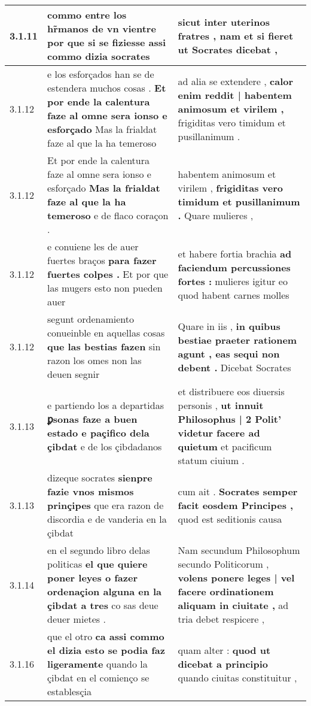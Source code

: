 \begin{tabular}{|p{1cm}|p{6.5cm}|p{6.5cm}|}
3.1.11 & commo entre los hr̃manos de vn vientre \textbf{ por que si se fiziesse } assi commo dizia socrates & sicut inter uterinos fratres , \textbf{ nam et si fieret } ut Socrates dicebat , \\\hline
3.1.12 & e los esforçados han se de estendera muchos cosas . \textbf{ Et por ende la calentura faze al omne sera ionso e esforçado } Mas la frialdat faze al que la ha temeroso & ad alia se extendere , \textbf{ calor enim reddit | habentem animosum et virilem , } frigiditas vero timidum et pusillanimum . \\\hline
3.1.12 & Et por ende la calentura faze al omne sera ionso e esforçado \textbf{ Mas la frialdat faze al que la ha temeroso } e de flaco coraçon . & habentem animosum et virilem , \textbf{ frigiditas vero timidum et pusillanimum . } Quare mulieres , \\\hline
3.1.12 & e conuiene les de auer fuertes braços \textbf{ para fazer fuertes colpes . } Et por que las mugers esto non pueden auer & et habere fortia brachia \textbf{ ad faciendum percussiones fortes : } mulieres igitur eo quod habent carnes molles \\\hline
3.1.12 & segunt ordenamiento conueinble en aquellas cosas \textbf{ que las bestias fazen } sin razon los omes non las deuen segnir & Quare in iis , \textbf{ in quibus bestiae praeter rationem agunt , eas sequi non debent . } Dicebat Socrates \\\hline
3.1.13 & e partiendo los a departidas \textbf{ ꝑsonas faze a buen estado e paçifico dela çibdat } e de los çibdadanos & et distribuere eos diuersis personis , \textbf{ ut innuit Philosophus | 2 Polit’ videtur facere ad quietum } et pacificum statum ciuium . \\\hline
3.1.13 & dizeque socrates \textbf{ sienpre fazie vnos mismos prinçipes } que era razon de discordia e de vanderia en la çibdat & cum ait . \textbf{ Socrates semper facit eosdem Principes , } quod est seditionis causa \\\hline
3.1.14 & en el segundo libro delas politicas \textbf{ el que quiere poner leyes o fazer ordenaçion alguna en la çibdat a tres } co sas deue deuer mietes . & Nam secundum Philosophum secundo Politicorum , \textbf{ volens ponere leges | vel facere ordinationem aliquam in ciuitate , } ad tria debet respicere , \\\hline
3.1.16 & que el otro \textbf{ ca assi commo el dizia esto se podia faz ligeramente } quando la çibdat en el comienço se establesçia & quam alter : \textbf{ quod ut dicebat a principio } quando ciuitas constituitur , \\\hline

\end{tabular}
